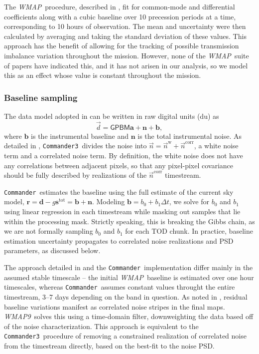 \documentclass[twocolumn]{../../common/aa}
\def\WMAP{\emph{WMAP}}
\def\WMAPnine{\emph{WMAP9}}
\def\commander{\texttt{Commander}}
\def\commanderthree{\texttt{Commander3}}
\newcommand{\n}[0]{\vec{n}}
\newcommand{\data}{\vec d}
\begin{document}
The \WMAP\ procedure, described in \citet{jarosik2003a}, fit for common-mode and differential coefficients along with a cubic baseline over 10 precession periods at a time, corresponding to 10 hours of observation. The mean and uncertainty were then calculated by averaging and taking the standard deviation of these values. This approach has the benefit of allowing for the tracking of possible transmission imbalance variation throughout the mission. However, none of the \WMAP\ suite of papers have indicated this, and it has not arisen in our analysis, so we model this as an effect whose value is constant throughout the mission.

\subsubsection{Baseline sampling}
\label{ssec:baseline}

The data model adopted in \citet{hinshaw2003a} can be written in raw digital units (du) as
\begin{equation}
	\data = \mathsf{GPBM}\boldsymbol a+\boldsymbol n+\boldsymbol b,
\end{equation}
where $\boldsymbol b$ is the instrumental baseline and $\boldsymbol n$ is the
total instrumental noise. As detailed in \citet{bp06}, \commanderthree\ divides
the noise into $\n=\n^\mathrm w+\n^\mathrm{corr}$, a white noise term and a
correlated noise term. By definition, the white noise does not have any
correlations between adjacent pixels, so that any pixel-pixel covariance should
be fully described by realizations of the $\n^\mathrm{corr}$ timestream.

\commander\ estimates the baseline using the full estimate of the current sky
model, $\boldsymbol r=\boldsymbol d-g\boldsymbol s^\mathrm{tot}=\boldsymbol
b+\boldsymbol n$. Modeling $\boldsymbol b=b_0+b_1\Delta t$, we solve for $b_0$
and $b_1$ using linear regression in each timestream while masking out samples
that lie within the processing mask. Strictly speaking, this is breaking the
Gibbs chain, as we are not formally sampling $b_0$ and $b_1$ for each TOD
chunk. In practice, baseline estimation uncertainty propagates to correlated
noise realizations and PSD parameters, as discussed below.

The approach detailed in \citet{hinshaw2003a} and the \commander\
implementation differ mainly in the assumed stable timescale -- the initial
\WMAP\ baseline is estimated over one hour timescales, whereas \commander\
assumes constant values throught the entire timestream, 3--7 days depending on
the band in question. As noted in \citet{hinshaw2003a}, residual baseline
variations manifest as correlated noise stripes in the final maps. \WMAPnine\
solves this using a time-domain filter, downweighting the data based off of the
noise characterization. This approach is equivalent to the \commanderthree\
procedure of removing a constrained realization of correlated noise from the
timestream directly, based on the best-fit to the noise PSD.
\end{document}
